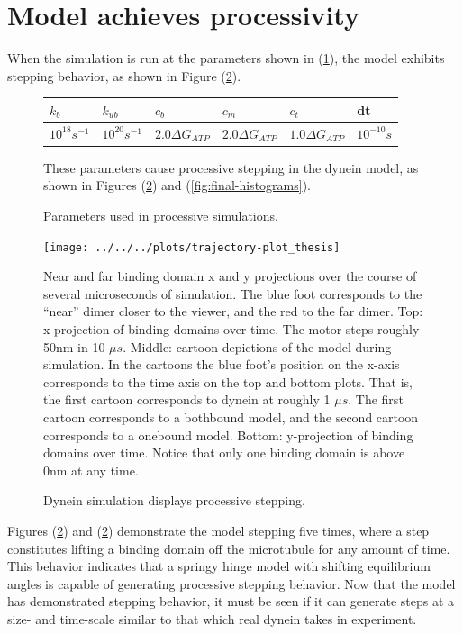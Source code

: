 \documentclass[
11pt, %
english, %
singlespacing, %
headsepline, %
chapterinoneline, %
]{MastersDoctoralThesis} %
\begin{document}
\section{Model achieves processivity}
When the simulation is run at the parameters shown in (\ref{table:thesis-parameters}), the model exhibits stepping behavior, as shown in Figure (\ref{fig:stepping-trajectory}).\\

\begin{figure}[h]
  \centering
  \begin{tabular}{| l | l | l | l | l | l |}
    \hline
    $k_{b}$ & $k_{ub}$ & $c_b$ &  $c_m$ & $c_t$ & dt\\\hline
    $10^{18} s^{-1}$ & $10^{20} s^{-1}$ & $2.0\Delta G_{ATP}$ & $2.0\Delta G_{ATP}$ & $1.0\Delta G_{ATP}$ & $10^{-10}s$\\ \hline
  \end{tabular}
  \caption{Parameters used in processive simulations.}{These parameters cause processive stepping in the dynein model, as shown in Figures (\ref{fig:stepping-trajectory}) and (\ref{fig:final-histograms}).}
  \label{table:thesis-parameters}
\end{figure}

\begin{figure}[h]
  \centering
  \texttt{[image: ../../../plots/trajectory-plot\_thesis]}
  \caption{Dynein simulation displays processive stepping.}{Near and far binding domain x and y projections over the course of several microseconds of simulation. The blue foot corresponds to the ``near'' dimer closer to the viewer, and the red to the far dimer. Top: x-projection of binding domains over time. The motor steps roughly 50nm in 10 $\mu s$. Middle: cartoon depictions of the model during simulation. In the cartoons the blue foot's position on the x-axis corresponds to the time axis on the top and bottom plots. That is, the first cartoon corresponds to dynein at roughly 1 $\mu s$. The first cartoon corresponds to a bothbound model, and the second cartoon corresponds to a onebound model. Bottom: y-projection of binding domains over time. Notice that only one binding domain is above 0nm at any time.}
  \label{fig:stepping-trajectory}
\end{figure}

Figures (\ref{fig:stepping-trajectory}) and (\ref{fig:stepping-trajectory}) demonstrate the model stepping five times, where a step constitutes lifting a binding domain off the microtubule for any amount of time. This behavior indicates that a springy hinge model with shifting equilibrium angles is capable of generating processive stepping behavior. Now that the model has demonstrated stepping behavior, it must be seen if it can generate steps at a size- and time-scale similar to that which real dynein takes in experiment.\\
\end{document}
